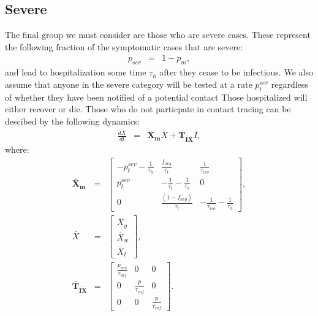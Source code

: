 \documentclass[notitlepage, superscriptaddress]{revtex4-2}
\begin{document}
\subsection{Severe}
The final group we must consider are those who are severe cases. These represent the following fraction of the symptomatic cases that are severe:
\begin{eqnarray}
p_{sev} &=& 1 - p_{m},
\end{eqnarray}
and lead to hospitalization some time $\tau_{h}$ after they cease to be infectious. We also assume that anyone in the severe category will be tested at a rate $p^{sev}_{t}$ regardless of whether they have been notified of a potential contact Those hospitalized will either recover or die. Those who do not particpate in contact tracing can be descibed by the following dynamics:
\begin{eqnarray}
\frac{d\bar{X}}{dt} &=& \boldsymbol{\bar{X}_{m}}  \bar{X} + \boldsymbol{\bar{T}_{\bar{I}\bar{X}}}  \bar{I}, 
\end{eqnarray}
where:
%
\begin{eqnarray}
\boldsymbol{\bar{X}_{m}} &=&
\begin{bmatrix}
- p^{sev}_{t} -\frac{1}{\tau_{h}}  &  \frac{f_{neg}}{\tau_{t}}            & \frac{1}{\tau_{iso}} \\ 
 p^{sev}_{t}              & -\frac{1}{\tau_{t}} -\frac{1}{\tau_{h}}       & 0  \\ 
 0                  & \frac{(1- f_{neg})}{\tau_{t}}                        & -\frac{1}{\tau_{iso}} -\frac{1}{\tau_{h}}
\end{bmatrix}, \\ 
%
\bar{X} &=& 
\begin{bmatrix}
\bar{X}_{g} \\ \bar{X}_{w}\\ \bar{X}_{t}
\end{bmatrix}, \\ 
%
\boldsymbol{\bar{T}_{\bar{I}\bar{X}}} &=&
\begin{bmatrix}
\frac{p_{sev}}{\tau_{inf}}  & 0                 & 0 \\ 
 0          &  \frac{p_{}}{\tau_{inf}}  & 0 \\ 
 0          & 0                 &  \frac{p_{}}{\tau_{inf}} 
\end{bmatrix}.
%
\end{eqnarray}
\end{document}
